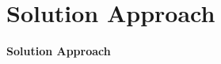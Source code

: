 






% 

\section{Solution Approach}
\begin{frame}
\begin{center}
{\LARGE \textbf{Solution Approach}}
\end{center}
\end{frame}

